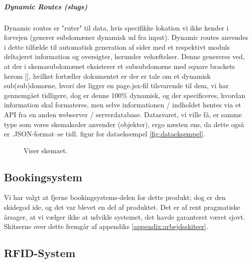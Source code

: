     \subparagraph{Dynamic Routes (slugs)}
    Dynamic routes er "ruter" til data, hvis specifikke lokation vi ikke kender i forvejen (generer subdomæner dynamisk ud fra input). Dynamic routes anvendes i dette tilfælde til automatisk generation af sider med et respektivt moduls deltajeret information og oversigter, herunder vehæftelser. 
    Denne genereres ved, at der i skemasubdomænet eksisterer et subsubdomæne med square brackets herom [], hvilket fortæller dokumentet er der er tale om et dynamisk sub(sub)domæne, hvori der ligger en page.jsx-fil tilsvarende til dem, vi har gennemgået tidligere, dog er denne 100\% dynamisk, og der specificeres, hvordan information skal formateres, men selve informationen / indholdet hentes via et API fra en anden webserver / serverdatabase. Datasvaret, vi ville få, er samme type som vores skemakoder anvender (objekter), ergo næsten ens, da dette også er .JSON-format--se tidl. figur for dataeksempel \ref{fig:dataeksempel}. 
        \begin{figure}[H]
        \centering
        \caption{Viser skemaet.}
        \end{figure}
\subsection{Bookingsystem}
    Vi har valgt at fjerne bookingsystems-delen for dette produkt; dog er den skidegod ide, og det var blevet en del af produktet. Det er af rent pragmatiske årsager, at vi vælger ikke at udvikle systemet, det havde garanteret været sjovt. Skitserne over dette fremgår af appendiks \ref{appendix:arbejdsskitser}.

\subsection{RFID-System}
